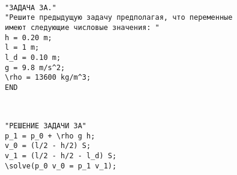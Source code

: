 \

\begin{verbatim}
"ЗАДАЧА 3А."
"Решите предыдущую задачу предполагая, что переменные 
имеют следующие числовые значения: "
h = 0.20 m;
l = 1 m;
l_d = 0.10 m;
g = 9.8 m/s^2;
\rho = 13600 kg/m^3;
END
\end{verbatim}

\

\begin{verbatim}
"РЕШЕНИЕ ЗАДАЧИ 3А"
p_1 = p_0 + \rho g h;
v_0 = (l/2 - h/2) S; 
v_1 = (l/2 - h/2 - l_d) S;
\solve(p_0 v_0 = p_1 v_1);
\end{verbatim}
